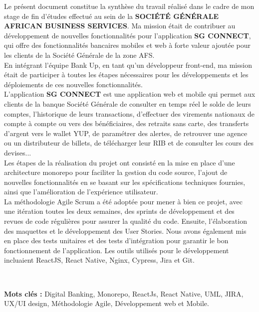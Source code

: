 
Le présent document constitue la synthèse du travail réalisé dans le cadre de mon stage de fin d’études effectué au sein de la \textbf{SOCIÉTÉ GÉNÉRALE AFRICAN BUSINESS SERVICES}. Ma mission était de contribuer au développement de nouvelles fonctionnalités pour l'application \textbf{SG CONNECT}, qui offre des fonctionnalités bancaires mobiles et web à forte valeur ajoutée pour les clients de la Société Générale de la zone AFS.\\

En intégrant l'équipe Bank Up, en tant qu'un développeur front-end, ma mission était de participer à toutes les étapes nécessaires pour les développements et les déploiements de ces nouvelles fonctionnalités.\\

L'application \textbf{SG CONNECT} est une application web et mobile qui permet aux clients de la banque Société Générale de consulter en temps réel le solde de leurs comptes, l'historique de leurs transactions, d'effectuer des virements nationaux de compte à compte ou vers des bénéficiaires, des retraits sans carte, des transferts d'argent vers le wallet YUP, de paramétrer des alertes, de retrouver une agence ou un distributeur de billets, de télécharger leur RIB et de consulter les cours des devises...\\

Les étapes de la réalisation du projet ont consisté en la mise en place d'une architecture monorepo pour faciliter la gestion du code source, l'ajout de nouvelles fonctionnalités en se basant sur les spécifications techniques fournies, ainsi que l'amélioration de l'expérience utilisateur.\\

La méthodologie Agile Scrum a été adoptée pour mener à bien ce projet, avec une itération toutes les deux semaines, des sprints de développement et des revues de code régulières pour assurer la qualité du code. Ensuite, l'élaboration des maquettes et le développement des User Stories. Nous avons également mis en place des tests unitaires et des tests d'intégration pour garantir le bon fonctionnement de l'application. Les outils utilisés pour le développement incluaient ReactJS, React Native, Nginx, Cypress, Jira et Git.
\vfill

\begin{center}
	\HRule \\
\end{center}

\textbf{Mots clés :} Digital Banking, Monorepo, ReactJs, React Native, UML, JIRA, UX/UI design, Méthodologie Agile, Développement web et Mobile.\\
\begin{center}
	\HRule 
\end{center}